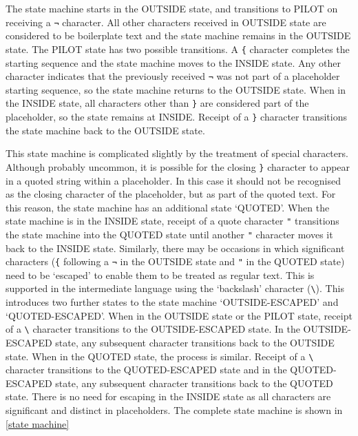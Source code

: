 The state machine starts in the OUTSIDE state, and transitions to PILOT on receiving a \verb!¬! character. All other characters received in OUTSIDE state are considered to be boilerplate text and the state machine remains in the OUTSIDE state. The PILOT state has two possible transitions. A \verb!{! character completes the starting sequence and the state machine moves to the INSIDE state. Any other character indicates that the previously received \verb!¬! was not part of a placeholder starting sequence, so the state machine returns to the OUTSIDE state. When in the INSIDE state, all characters other than \verb!}! are considered part of the placeholder, so the state remains at INSIDE. Receipt of a \verb!}! character transitions the state machine back to the OUTSIDE state.

This state machine is complicated slightly by the treatment of special characters. Although probably uncommon, it is possible for the closing \verb!}! character to appear in a quoted string within a placeholder. In this case it should not be recognised as the closing character of the placeholder, but as part of the quoted text. For this reason, the state machine has an additional state `QUOTED'. When the state machine is in the INSIDE state, receipt of a quote character \verb!"! transitions the state machine into the QUOTED state until another \verb!"! character moves it back to the INSIDE state. Similarly, there may be occasions in which significant characters (\verb!{! following a \verb!¬! in the OUTSIDE state and \verb!"! in the QUOTED state) need to be `escaped' to enable them to be treated as regular text. This is supported in the intermediate language using the `backslash' character (\verb!\!). This introduces two further states to the state machine `OUTSIDE-ESCAPED' and `QUOTED-ESCAPED'. When in the OUTSIDE state or the PILOT state, receipt of a \verb!\! character transitions to the OUTSIDE-ESCAPED state. In the OUTSIDE-ESCAPED state, any subsequent character transitions back to the OUTSIDE state. When in the QUOTED state, the process is similar. Receipt of a \verb!\! character transitions to the QUOTED-ESCAPED state and in the QUOTED-ESCAPED state, any subsequent character transitions back to the QUOTED state. There is no need for escaping in the INSIDE state as all characters are significant and distinct in placeholders. The complete state machine is shown in \autoref{state machine}

